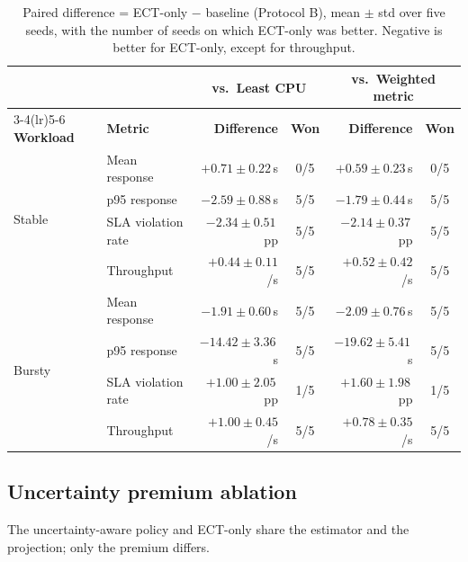 \documentclass[11pt,a4paper]{article}
\begin{document}
\begin{table}[H]
\caption{Paired difference = ECT-only $-$ baseline (Protocol B), mean $\pm$ std over five seeds, with the
number of seeds on which ECT-only was better. Negative is better for ECT-only, except for throughput.}\label{tab:v2vsbase}
\centering
\small
\begin{tabular}{llrcrc}
\toprule
& & \multicolumn{2}{c}{\textbf{vs.\ Least CPU}} & \multicolumn{2}{c}{\textbf{vs.\ Weighted metric}}\\
\cmidrule(lr){3-4}\cmidrule(lr){5-6}
\textbf{Workload} & \textbf{Metric} & \textbf{Difference} & \textbf{Won} & \textbf{Difference} & \textbf{Won}\\
\midrule
\multirow{4}{*}{Stable} & Mean response & $+0.71 \pm 0.22$\,s & 0/5 & $+0.59 \pm 0.23$\,s & 0/5\\
 & p95 response & $-2.59 \pm 0.88$\,s & 5/5 & $-1.79 \pm 0.44$\,s & 5/5\\
 & SLA violation rate & $-2.34 \pm 0.51$\,pp & 5/5 & $-2.14 \pm 0.37$\,pp & 5/5\\
 & Throughput & $+0.44 \pm 0.11$\,/s & 5/5 & $+0.52 \pm 0.42$\,/s & 5/5\\
\midrule
\multirow{4}{*}{Bursty} & Mean response & $-1.91 \pm 0.60$\,s & 5/5 & $-2.09 \pm 0.76$\,s & 5/5\\
 & p95 response & $-14.42 \pm 3.36$\,s & 5/5 & $-19.62 \pm 5.41$\,s & 5/5\\
 & SLA violation rate & $+1.00 \pm 2.05$\,pp & 1/5 & $+1.60 \pm 1.98$\,pp & 1/5\\
 & Throughput & $+1.00 \pm 0.45$\,/s & 5/5 & $+0.78 \pm 0.35$\,/s & 5/5\\
\bottomrule
\end{tabular}
\end{table}

\subsection{Uncertainty premium ablation}
The uncertainty-aware policy and ECT-only share the estimator and the projection; only the premium differs.
\end{document}
